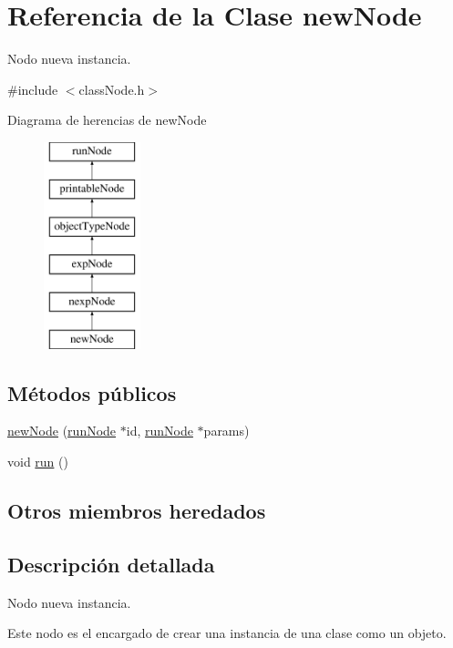 \hypertarget{classnewNode}{\section{Referencia de la Clase new\-Node}
\label{classnewNode}
}


Nodo nueva instancia.  




{\ttfamily \#include $<$class\-Node.\-h$>$}

Diagrama de herencias de new\-Node\begin{figure}[H]
\begin{center}
\leavevmode
\includegraphics[height=6.000000cm]{classnewNode}
\end{center}
\end{figure}
\subsection*{Métodos públicos}
\begin{DoxyCompactItemize}
\item 
\hyperlink{classnewNode_a05ceeb26698dae7dac2b64caac4f0973}{new\-Node} (\hyperlink{classrunNode}{run\-Node} $\ast$id, \hyperlink{classrunNode}{run\-Node} $\ast$params)
\item 
void \hyperlink{classnewNode_afa5d1d8599f4dd6d7e68b04ad0c12b15}{run} ()
\end{DoxyCompactItemize}
\subsection*{Otros miembros heredados}


\subsection{Descripción detallada}
Nodo nueva instancia. 

Este nodo es el encargado de crear una instancia de una clase como un objeto.

